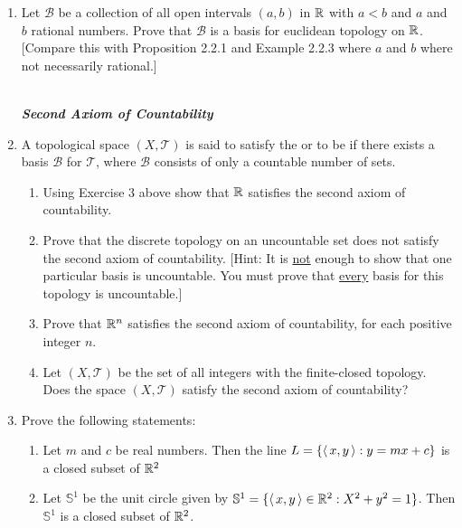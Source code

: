 \documentclass[10pt,a4paper]{report}
\newcommand{\SPECIAL}[1]{\begin{center}
	{\Large \textbf{\textit{\\#1}} }
\end{center}
}
\newcommand{\BB}{\mathcal{B}}
\newcommand{\TT}{\mathcal{T}}
\newcommand{\SSS}{\mathbb{S}}
\begin{document}
\begin{enumerate}
\begin{enumerate}[label=(\roman*)]
\end{enumerate}

\item Let $\BB$ be a collection of all open intervals $(a,b)$ in $\mathbb{R}$ with $a < b$ and $a$ and $b$ rational numbers.  Prove that $\BB$ is a basis for euclidean topology on $\mathbb{R}$.[Compare this with Proposition 2.2.1 and Example 2.2.3 where $a$ and $b$ where not necessarily rational.]

\SPECIAL{Second Axiom of Countability}

\item A topological space $(X, \TT)$ is said to satisfy the  or to be  if there exists a basis $\BB$ for $\TT$, where $\BB$ consists of only a countable number of sets.

\begin{enumerate}[label=(\roman*)]

	\item Using Exercise 3 above show that $\mathbb{R}$ satisfies the second axiom of countability.
	
	\item Prove that the discrete topology on an uncountable set does not satisfy the second axiom of countability. [Hint: It is \underline{not} enough to show that one particular basis is uncountable.  You must prove that \underline{every} basis for this topology is uncountable.]
	
	\item Prove that $\mathbb{R}^n$ satisfies the second axiom of countability, for each positive integer $n$.
	
	\item Let $(X, \TT)$ be the set of all integers with the finite-closed topology.  Does the space $(X, \TT)$ satisfy the second axiom of countability?
	
\end{enumerate}

\item Prove the following statements:

\begin{enumerate}[label=(\roman*)]

	\item Let $m$ and $c$ be real numbers.  Then the line $L=\{\left \langle\, x,y \,\right \rangle: y=mx+c\}$ is a closed subset of $\mathbb{R}^2$
	
	\item Let $\SSS^1$ be the unit circle given by $\SSS^1 = \{\ABRACKET{x,y} \in \R^2 : X^2+y^2=1\}$.  Then $\SSS^1$ is a closed subset of $\mathbb{R}^2$.
	

\end{enumerate}
\end{enumerate}
\end{document}
